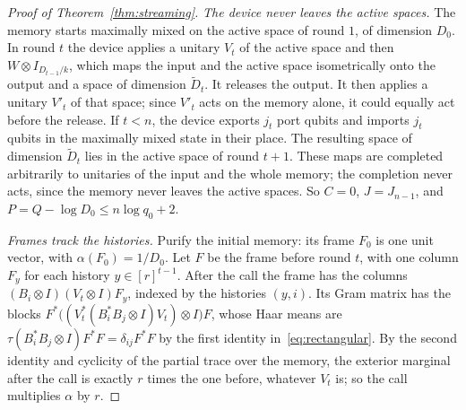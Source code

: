 \begin{proof}[Proof of Theorem~\ref{thm:streaming}]
\emph{The device never leaves the active spaces.} The memory starts maximally mixed on the active space of round $1$, of dimension $D_0$. In
round $t$ the device applies a unitary $V_t$ of the active space and then $W\otimes I_{D_{t-1}/k}$, which maps the input and the active space
isometrically onto the output and a space of dimension $\widetilde D_t$. It releases the output. It then applies a unitary $V'_t$ of that space;
since $V'_t$ acts on the memory alone, it could equally act before the release. If $t<n$, the device exports $j_t$ port qubits and imports
$j_t$ qubits in the maximally mixed state in their place. The resulting space of dimension $\widetilde D_t$ lies in the active space of round
$t+1$. These maps are completed arbitrarily to unitaries of the input and the whole memory; the completion never acts, since the memory never
leaves the active spaces. So $C=0$, $J=J_{n-1}$, and $P=Q-\log D_0\le n\log q_0+2$.

\emph{Frames track the histories.} Purify the initial memory: its frame $F_0$ is one unit vector, with $\alpha(F_0)=1/D_0$. Let $F$ be the frame
before round $t$, with one column $F_y$ for each history $y\in[r]^{t-1}$. After the call the frame has the columns $(B_i\otimes I)(V_t\otimes I)F_y$,
indexed by the histories $(y,i)$. Its Gram matrix has the blocks $F^*\bigl((V_t^*(B_i^*B_j\otimes I)V_t)\otimes I\bigr)F$, whose Haar means are
$\tau(B_i^*B_j\otimes I)F^*F=\delta_{ij}F^*F$ by the first identity in~\eqref{eq:rectangular}. By the second identity and cyclicity of the partial
trace over the memory, the exterior marginal after the call is exactly $r$ times the one before, whatever $V_t$ is; so the call multiplies
$\alpha$ by $r$.


\end{proof}
